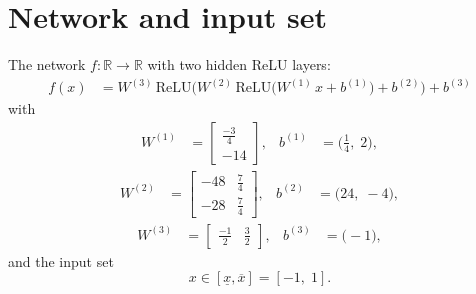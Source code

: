 \documentclass[11pt]{article}
\begin{document}
\section{Network and input set}
The network $f:\mathbb{R} \to \mathbb{R}$ with two hidden ReLU layers:
\begin{align*}
f(x) &= W^{(3)}\,\mathrm{ReLU}\bigl(W^{(2)}\,\mathrm{ReLU}\bigl(W^{(1)}\,x + b^{(1)}\bigr) + b^{(2)}\bigr) + b^{(3)}
\end{align*}
with
\begin{align*}
W^{(1)} &= \begin{bmatrix}
\frac{-3}{4} \\
-14
\end{bmatrix}, & b^{(1)} &= \bigl(\frac{1}{4},\; 2\bigr),
\end{align*}
\begin{align*}
W^{(2)} &= \begin{bmatrix}
-48 & \frac{7}{4} \\
-28 & \frac{7}{4}
\end{bmatrix}, & b^{(2)} &= \bigl(24,\; -4\bigr),
\end{align*}
\begin{align*}
W^{(3)} &= \begin{bmatrix}
\frac{-1}{2} & \frac{3}{2}
\end{bmatrix}, & b^{(3)} &= \bigl(-1\bigr),
\end{align*}
and the input set
\begin{equation*}
 x \in [\underline{x}, \overline{x}] = [-1,\; 1].
\end{equation*}
\end{document}
